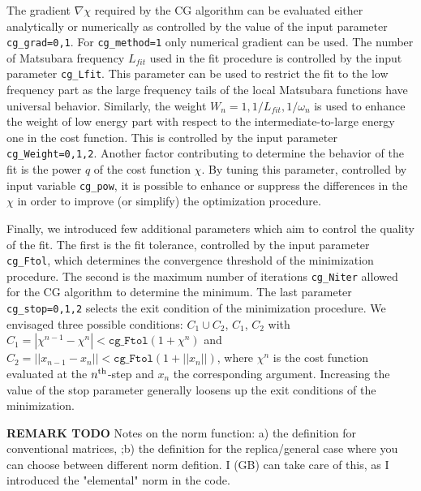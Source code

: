 \documentclass[edipack2.tex]{subfiles}
\begin{document}
The gradient $\nabla\chi$ required by the CG algorithm can be
evaluated either analytically or numerically as
controlled by the value of the input parameter \texttt{cg\_grad=0,1}. For
\texttt{cg\_method=1} only numerical gradient can be used.
The number of Matsubara frequency $L_{fit}$ used in the fit procedure
is controlled  by the input parameter \texttt{cg\_Lfit}.
This parameter can be used to restrict the fit to the low frequency
part as the large frequency tails of the local Matsubara functions
have universal behavior.
Similarly, the weight  $W_n=1,1/L_{fit},1/\omega_n$ is used to
enhance the weight of low energy part with respect to the
intermediate-to-large energy one in the cost function.
This is controlled by the input parameter \texttt{cg\_Weight=0,1,2}.
Another  factor contributing to determine the behavior
of the fit is the power $q$ of the cost function $\chi$. By tuning
this parameter, controlled by input variable \texttt{cg\_pow}, it is
possible to enhance or suppress the differences in the $\chi$ in order
to improve (or simplify) the optimization procedure.  

Finally, we introduced few additional parameters which aim to
control the quality of the fit. The first is the fit tolerance,
controlled by the input parameter \texttt{cg\_Ftol}, which
determines the convergence threshold of the minimization procedure.
The second is the maximum number of iterations \texttt{cg\_Niter}
allowed for the CG algorithm to determine the minimum.
The last parameter \texttt{cg\_stop=0,1,2} selects the exit
condition of the minimization procedure. We envisaged  three
possible conditions: $C_1\cup C_2$, $C_1$, $C_2$ with 
$C_1=|\chi^{n-1} -\chi^n|<\mathtt{cg\_Ftol}(1+\chi^n)$ and
$C_2=||x_{n-1} -x_n||<\mathtt{cg\_Ftol}(1+||x_n||)$, where $\chi^n$
is the cost function evaluated at the $n^{\rm th}$-step and $x_n$
the corresponding argument. Increasing the value of the stop
parameter generally loosens up the exit conditions of the minimization.   

{\bf REMARK TODO}
Notes on the norm function: a) the definition for conventional
matrices, ;b) the definition for the replica/general case where you
can choose between different norm defition.
{\color{red} I (GB) can take care of this, as I introduced the "elemental" norm in the code.}
\end{document}
